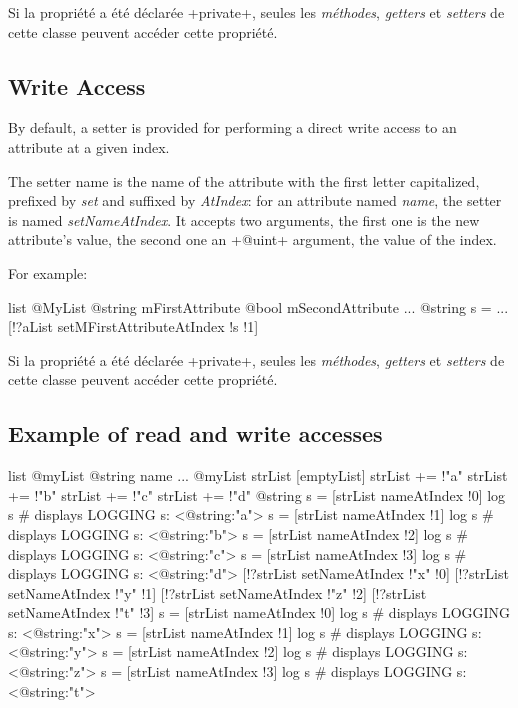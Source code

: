 Si la propriété a été déclarée \ggs+private+, seules les \emph{méthodes}, \emph{getters} et \emph{setters} de cette classe peuvent accéder cette propriété.



\subsection{Write Access}

By default, a setter is provided for performing a direct write access to an attribute at a given index.

The setter name is the name of the attribute with the first letter capitalized, prefixed by \emph{set} and suffixed by \emph{AtIndex}: for an attribute named \emph{name}, the setter is named \emph{setNameAtIndex}. It accepts two arguments, the first one is the new attribute's value, the second one an \ggs+@uint+ argument, the value of the index.

For example:

\begin{galgas}
list @MyList {
  @string mFirstAttribute
  @bool mSecondAttribute
}
...
@string s = ...
[!?aList setMFirstAttributeAtIndex !s !1]
\end{galgas}

Si la propriété a été déclarée \ggs+private+, seules les \emph{méthodes}, \emph{getters} et \emph{setters} de cette classe peuvent accéder cette propriété.


\subsection{Example of read and write accesses}

\begin{galgas}
list @myList {
  @string name
}
...
@myList strList [emptyList]
strList += !"a"
strList += !"b"
strList += !"c"
strList += !"d"
@string s = [strList nameAtIndex !0]
log s # displays LOGGING s: <@string:"a">
s = [strList nameAtIndex !1]
log s # displays LOGGING s: <@string:"b">
s = [strList nameAtIndex !2]
log s # displays LOGGING s: <@string:"c">
s = [strList nameAtIndex !3]
log s # displays LOGGING s: <@string:"d">
[!?strList setNameAtIndex !"x" !0]
[!?strList setNameAtIndex !"y" !1]
[!?strList setNameAtIndex !"z" !2]
[!?strList setNameAtIndex !"t" !3]
s = [strList nameAtIndex !0]
log s # displays LOGGING s: <@string:"x">
s = [strList nameAtIndex !1]
log s # displays LOGGING s: <@string:"y">
s = [strList nameAtIndex !2]
log s # displays LOGGING s: <@string:"z">
s = [strList nameAtIndex !3]
log s # displays LOGGING s: <@string:"t">
\end{galgas}


